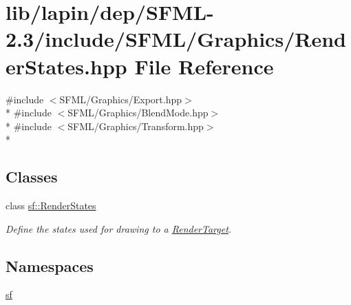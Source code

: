 \hypertarget{lapin_2dep_2_s_f_m_l-2_83_2include_2_s_f_m_l_2_graphics_2_render_states_8hpp}{\section{lib/lapin/dep/\-S\-F\-M\-L-\/2.3/include/\-S\-F\-M\-L/\-Graphics/\-Render\-States.hpp File Reference}
\label{lapin_2dep_2_s_f_m_l-2_83_2include_2_s_f_m_l_2_graphics_2_render_states_8hpp}
}
{\ttfamily \#include $<$S\-F\-M\-L/\-Graphics/\-Export.\-hpp$>$}\\*
{\ttfamily \#include $<$S\-F\-M\-L/\-Graphics/\-Blend\-Mode.\-hpp$>$}\\*
{\ttfamily \#include $<$S\-F\-M\-L/\-Graphics/\-Transform.\-hpp$>$}\\*
\subsection*{Classes}
\begin{DoxyCompactItemize}
\item 
class \hyperlink{classsf_1_1_render_states}{sf\-::\-Render\-States}
\begin{DoxyCompactList}\small\item\em Define the states used for drawing to a \hyperlink{classsf_1_1_render_target}{Render\-Target}. \end{DoxyCompactList}\end{DoxyCompactItemize}
\subsection*{Namespaces}
\begin{DoxyCompactItemize}
\item 
\hyperlink{namespacesf}{sf}
\end{DoxyCompactItemize}
